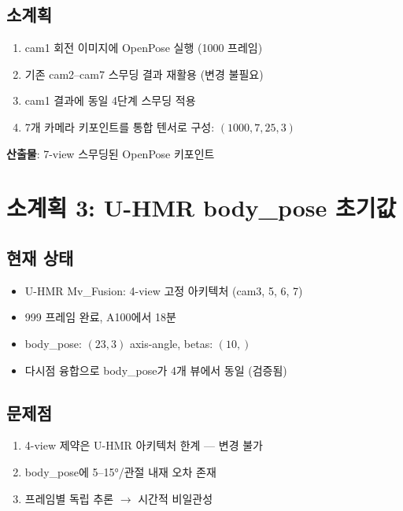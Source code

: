 \documentclass[11pt, a4paper]{report}
\begin{document}
\subsection{소계획}
\begin{pipelinebox}[title={SP-2: 7-view 2D 키포인트 완성}]
\begin{enumerate}
\item cam1 회전 이미지에 OpenPose 실행 (1000 프레임)
\item 기존 cam2--cam7 스무딩 결과 재활용 (변경 불필요)
\item cam1 결과에 동일 4단계 스무딩 적용
\item 7개 카메라 키포인트를 통합 텐서로 구성: $(1000, 7, 25, 3)$
\end{enumerate}
\textbf{산출물}: 7-view 스무딩된 OpenPose 키포인트
\end{pipelinebox}


\section{소계획 3: U-HMR body\_pose 초기값}
\label{sec:sp3}

\subsection{현재 상태}
\begin{itemize}
\item U-HMR Mv\_Fusion: 4-view 고정 아키텍처 (cam3, 5, 6, 7)
\item 999 프레임 완료, A100에서 18분
\item body\_pose: $(23, 3)$ axis-angle, betas: $(10,)$
\item 다시점 융합으로 body\_pose가 4개 뷰에서 동일 (검증됨)
\end{itemize}

\subsection{문제점}
\begin{enumerate}
\item 4-view 제약은 U-HMR 아키텍처 한계 --- 변경 불가
\item body\_pose에 5--15°/관절 내재 오차 존재
\item 프레임별 독립 추론 $\to$ 시간적 비일관성
\end{enumerate}
\end{document}
